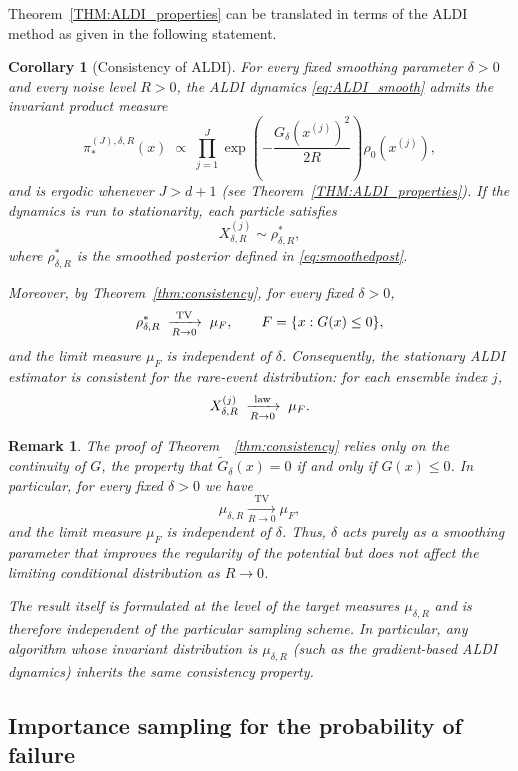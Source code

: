 \documentclass[a4paper]{article}
\numberwithin{equation}{section}
\newtheorem{corollary}[theorem]{Corollary}
\newtheorem{remark}[theorem]{Remark}
\begin{document}
Theorem~\ref{THM:ALDI_properties} can be translated in terms of the ALDI method as given in the following statement.

\begin{corollary}[Consistency of ALDI]
For every fixed smoothing parameter $\delta>0$ and every noise level $R>0$,
the ALDI dynamics \eqref{eq:ALDI_smooth} admits the invariant product measure
\[
\pi^{(J),\delta,R}_{*}(x) \;\propto\; 
\prod_{j=1}^J 
\exp\!\left(-\frac{ G_\delta(x^{(j)})^2 }{2R}\right)\rho_0(x^{(j)}),
\]
and is ergodic whenever $J>d+1$ (see Theorem~\ref{THM:ALDI_properties}).  
If the dynamics is run to stationarity, each particle satisfies
\[
X^{(j)}_{\delta,R}\sim \rho^*_{\delta,R},
\]
where $\rho^*_{\delta,R}$ is the smoothed posterior defined in
\eqref{eq:smoothedpost}.

Moreover, by Theorem~\ref{thm:consistency}, for every fixed $\delta>0$,
\[
\rho^*_{\delta,R} 
\;\xrightarrow[R\to 0]{\rm TV}\;
\mu_F ,
\qquad 
F=\{x : G(x)\le 0\},
\]
and the limit measure $\mu_F$ is independent of $\delta$.
Consequently, the stationary ALDI estimator is consistent for the
rare-event distribution: for each ensemble index $j$,
\[
X^{(j)}_{\delta,R}
\;\xrightarrow[R\to 0]{\rm law}\;
\mu_F .
\]
\end{corollary}


\begin{remark}
The proof of Theorem~~\ref{thm:consistency} relies only on the continuity of $G$, 
the property that $\tilde G_\delta(x)=0$ if and only if $G(x)\le 0$.
In particular, for every fixed $\delta>0$ we have
\[
\mu_{\delta,R} \xrightarrow[R\to 0]{\mathrm{TV}} \mu_F,
\]
and the limit measure $\mu_F$ is independent of $\delta$. 
Thus, $\delta$ acts purely as a smoothing parameter that improves the 
regularity of the potential but does not affect the limiting conditional
distribution as $R\to 0$. 

The result itself is formulated at the level of the target measures 
$\mu_{\delta,R}$ and is therefore independent of the particular sampling 
scheme. In particular, any algorithm whose invariant distribution is 
$\mu_{\delta,R}$ (such as the gradient-based ALDI dynamics) inherits the same consistency property.
\end{remark}

 \subsection{Importance sampling for the probability of failure}
\label{subsec:IS}
\end{document}
